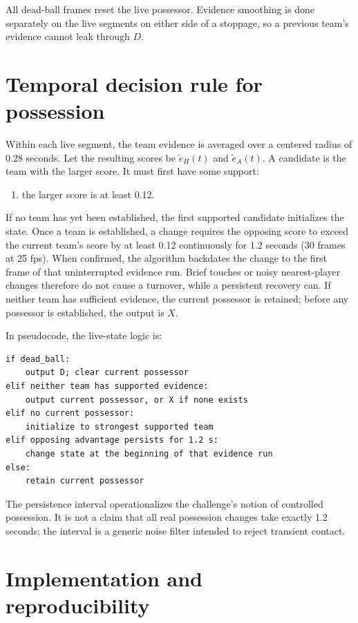\documentclass[11pt,a4paper]{article}
\begin{document}
All dead-ball frames reset the live possessor. Evidence smoothing is done separately on the live
segments on either side of a stoppage, so a previous team's evidence cannot leak through $D$.

\section{Temporal decision rule for possession}

Within each live segment, the team evidence is averaged over a centered radius of 0.28 seconds. Let
the resulting scores be $\widetilde e_H(t)$ and $\widetilde e_A(t)$. A candidate is the team with
the larger score. It must first have some support:
\begin{enumerate}[leftmargin=*]
  \item the larger score is at least 0.12.
\end{enumerate}

If no team has yet been established, the first supported candidate initializes the state. Once a
team is established, a change requires the opposing score to exceed the current team's score by at
least 0.12 continuously for 1.2 seconds (30 frames at 25 fps). When confirmed, the algorithm
backdates the change to the first frame of that uninterrupted evidence run. Brief touches or noisy
nearest-player changes therefore do not cause a turnover, while a persistent recovery can. If
neither team has sufficient evidence, the current possessor is retained; before any possessor is
established, the output is $X$.

In pseudocode, the live-state logic is:
\begin{lstlisting}
if dead_ball:
    output D; clear current possessor
elif neither team has supported evidence:
    output current possessor, or X if none exists
elif no current possessor:
    initialize to strongest supported team
elif opposing advantage persists for 1.2 s:
    change state at the beginning of that evidence run
else:
    retain current possessor
\end{lstlisting}

The persistence interval operationalizes the challenge's notion of controlled possession. It is
not a claim that all real possession changes take exactly 1.2 seconds; the interval is a generic
noise filter intended to reject transient contact.

\section{Implementation and reproducibility}
\end{document}
